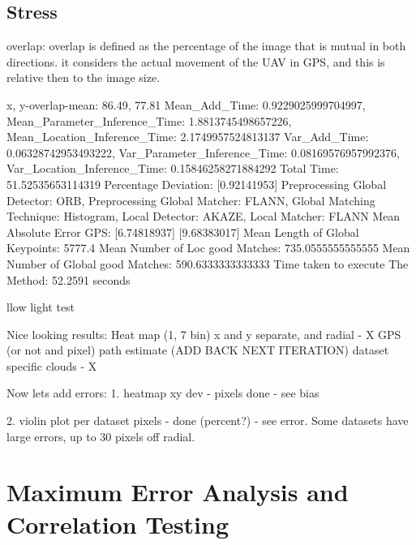 \subsection*{Stress}

overlap: overlap is defined as the percentage of the image that is mutual in both directions. it considers the actual movement of the UAV in GPS, and this is relative then to the image size. 



x, y-overlap-mean: 86.49, 77.81
Mean_Add_Time: 0.9229025999704997, Mean_Parameter_Inference_Time: 1.8813745498657226, Mean_Location_Inference_Time: 2.1749957524813137
Var_Add_Time: 0.06328742953493222, Var_Parameter_Inference_Time: 0.08169576957992376, Var_Location_Inference_Time: 0.15846258271884292
Total Time: 51.52535653114319
Percentage Deviation: [0.92141953] %
Preprocessing Global Detector: ORB, Preprocessing Global Matcher: FLANN, Global Matching Technique: Histogram, Local Detector: AKAZE, Local Matcher: FLANN
Mean Absolute Error GPS: [6.74818937]
[9.68383017]
Mean Length of Global Keypoints: 5777.4
Mean Number of Loc good Matches: 735.0555555555555
Mean Number of Global good Matches: 590.6333333333333
Time taken to execute The Method: 52.2591 seconds

llow light test



Nice looking results:
Heat map (1, 7 bin) x and y separate, and radial - X 
GPS (or not and pixel) path estimate (ADD BACK NEXT ITERATION)
dataset specific clouds - X


Now lets add errors:
1. heatmap xy dev - pixels done - see bias


2. violin plot per dataset pixels - done (percent?) - see error. Some datasets have large errors, up to 30 pixels off radial.


\section{Maximum Error Analysis and Correlation Testing}



